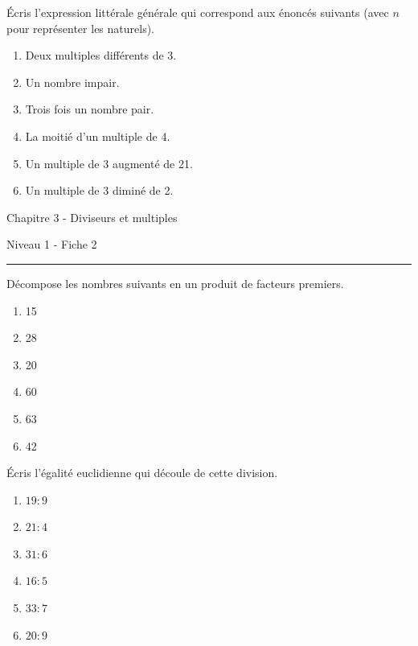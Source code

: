 \documentclass[12pt,parskip=half-, twoside=semi]{scrartcl}
\begin{document}
\begin{exercise}
    Écris l'expression littérale générale qui correspond aux énoncés suivants (avec \(n\) pour représenter les naturels).
    \begin{enumerate}[cols=2]
        \item Deux multiples différents de 3.
        \item Un nombre impair.
        \item Trois fois un nombre pair.
        \item La moitié d'un multiple de 4. 
        \item Un multiple de 3 augmenté de 21.
        \item Un multiple de 3 diminé de 2.
    \end{enumerate}
  \end{exercise}

\newpage 


\begin{center}
  \bfseries
  \begin{Huge}
    Chapitre 3 - Diviseurs et multiples
  \end{Huge}
  \smallbreak
  \begin{large}
    Niveau 1  - Fiche 2
  \end{large}
  \smallbreak
  \rule[10pt]{.5\linewidth}{1 pt}
\end{center}
  

\setcounter{exercise}{0}
  \begin{exercise}
      Décompose les nombres suivants en un produit de facteurs premiers.

    \begin{enumerate}[cols=3]
        \item 15
        \item 28
        \item 20
        \item 60
        \item 63
        \item 42
    \end{enumerate}
  \end{exercise}
   
  \begin{exercise}
    Écris l'égalité euclidienne qui découle de cette
  division.
    \begin{enumerate}[cols=3]
      \item $19 : 9$
      \item $21 : 4$
      \item $31 : 6$
      \item $16 : 5$
      \item $33 : 7$
      \item $20 : 9$
    \end{enumerate}
  \end{exercise}
  
\end{document}
